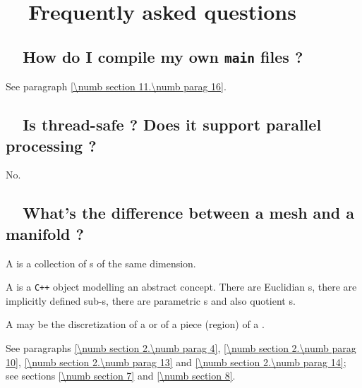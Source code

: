 
\chapter {~~{Frequently asked questions}}\label{\numb section 13}

\section{~~How do I compile my own {\tt main} files ?}\label{\numb section 13.\numb parag 1}

See paragraph \ref{\numb section 11.\numb parag 16}.


\section{~~Is {\maniFEM} thread-safe ? Does it support parallel processing ?}
\label{\numb section 13.\numb parag 2}

No.


\section{~~What's the difference between a mesh and a manifold ?}
\label{\numb section 13.\numb parag 3}

A {\small\tt{}} is a collection of {\small\tt{}}s of the
same dimension.

A {\small\tt{}} is a {\tt C++} object modelling an abstract concept.
There are Euclidian {\small\tt{}}s, there are implicitly defined
sub-{\small\tt{}}s, there are parametric {\small\tt{}}s
and also quotient {\small\tt{}}s.

A {\small\tt{}} may be the discretization of a {\small\tt{}}
or of a piece (region) of a {\small\tt{}}.

See paragraphs \ref{\numb section 2.\numb parag 4}, \ref{\numb section 2.\numb parag 10},
\ref{\numb section 2.\numb parag 13} and \ref{\numb section 2.\numb parag 14};
see sections \ref{\numb section 7} and \ref{\numb section 8}.


